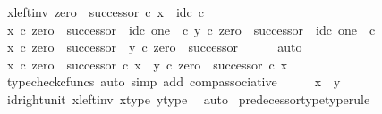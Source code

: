\begin{isabellebody}
\ x{\isacharunderscore}{\kern0pt}left{\isacharunderscore}{\kern0pt}inv{\isacharcolon}{\kern0pt}\ {\isachardoublequoteopen}zero\ {\isasymamalg}\ successor\ {\isasymcirc}\isactrlsub c\ x\ {\isacharequal}{\kern0pt}\ id\isactrlsub c\ {\isasymnat}\isactrlsub c{\isachardoublequoteclose}\isanewline
\ \ \isamarkupfalse%
\ {\isachardoublequoteopen}x\ {\isasymcirc}\isactrlsub c\ zero\ {\isasymamalg}\ successor\ {\isacharequal}{\kern0pt}\ id\isactrlsub c\ {\isacharparenleft}{\kern0pt}one\ {\isasymCoprod}\ {\isasymnat}\isactrlsub c{\isacharparenright}{\kern0pt}{\isachardoublequoteclose}\ {\isachardoublequoteopen}y\ {\isasymcirc}\isactrlsub c\ zero\ {\isasymamalg}\ successor\ {\isacharequal}{\kern0pt}\ id\isactrlsub c\ {\isacharparenleft}{\kern0pt}one\ {\isasymCoprod}\ {\isasymnat}\isactrlsub c{\isacharparenright}{\kern0pt}{\isachardoublequoteclose}\isanewline
\ \ \isamarkupfalse%
\ \isamarkupfalse%
\ {\isachardoublequoteopen}x\ {\isasymcirc}\isactrlsub c\ zero\ {\isasymamalg}\ successor\ {\isacharequal}{\kern0pt}\ y\ {\isasymcirc}\isactrlsub c\ zero\ {\isasymamalg}\ successor{\isachardoublequoteclose}\isanewline
\ \ \ \ \isamarkupfalse%
\ auto\isanewline
\ \ \isamarkupfalse%
\ \isamarkupfalse%
\ {\isachardoublequoteopen}x\ {\isasymcirc}\isactrlsub c\ zero\ {\isasymamalg}\ successor\ {\isasymcirc}\isactrlsub c\ x\ {\isacharequal}{\kern0pt}\ y\ {\isasymcirc}\isactrlsub c\ zero\ {\isasymamalg}\ successor\ {\isasymcirc}\isactrlsub c\ x{\isachardoublequoteclose}\isanewline
\ \ \ \ \isamarkupfalse%
\ {\isacharparenleft}{\kern0pt}typecheck{\isacharunderscore}{\kern0pt}cfuncs{\isacharcomma}{\kern0pt}\ auto\ simp\ add{\isacharcolon}{\kern0pt}\ comp{\isacharunderscore}{\kern0pt}associative{}{\isacharparenright}{\kern0pt}\isanewline
\ \ \isamarkupfalse%
\ \isamarkupfalse%
\ {\isachardoublequoteopen}x\ {\isacharequal}{\kern0pt}\ y{\isachardoublequoteclose}\isanewline
\ \ \ \ \isamarkupfalse%
\ id{\isacharunderscore}{\kern0pt}right{\isacharunderscore}{\kern0pt}unit{}\ x{\isacharunderscore}{\kern0pt}left{\isacharunderscore}{\kern0pt}inv\ x{\isacharunderscore}{\kern0pt}type\ y{\isacharunderscore}{\kern0pt}type\ \isamarkupfalse%
\ auto\isanewline
{}\isamarkupfalse%
%
\endisatagproof
{\isafoldproof}%
%
\isadelimproof
\isanewline
%
\endisadelimproof
\isanewline
{}\isamarkupfalse%
\ predecessor{\isacharunderscore}{\kern0pt}type{\isacharbrackleft}{\kern0pt}type{\isacharunderscore}{\kern0pt}rule{\isacharbrackright}{\kern0pt}{\isacharcolon}{\kern0pt}\isanewline

\end{isabellebody}
